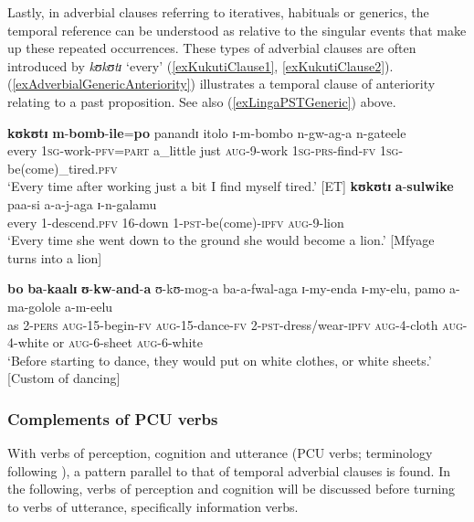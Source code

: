 Lastly, in adverbial clauses referring to iteratives, habituals or generics, the temporal reference can be understood as relative to the singular events that make up these repeated occurrences. These types of adverbial clauses are often introduced by \textit{kʊkʊtɪ} \lq every' (\ref{exKukutiClause1}, \ref{exKukutiClause2}). (\ref{exAdverbialGenericAnteriority}) illustrates a temporal clause of anteriority relating to a past  proposition. See also (\ref{exLingaPSTGeneric}) above.
\begin{exe}
\ex \label{exKukutiClause1}\gll \textbf{kʊkʊtɪ} \textbf{m}-\textbf{bomb}-\textbf{ile}=\textbf{po} panandɪ itolo ɪ-m-bombo n-gw-ag-a n-gateele\\
every \textsc{1sg}-work-\textsc{pfv}=\textsc{part} a\_little just \textsc{aug}-9-work \textsc{1sg}-\textsc{prs}-find-\textsc{fv} \textsc{1sg}-be(come)\_tired.\textsc{pfv}\\
\glt \lq Every time after working just a bit I find myself tired.' [ET]
\ex \label{exKukutiClause2} \gll \textbf{kʊkʊtɪ} \textbf{a}-\textbf{sulwike} paa-si a-a-j-aga ɪ-n-galamu\\
every 1-descend.\textsc{pfv} 16-down 1-\textsc{pst}-be(come)-\textsc{ipfv} \textsc{aug}-9-lion\\
\glt \lq Every time she went down to the ground she would become a lion.' [Mfyage turns into a lion]

\ex\label{exAdverbialGenericAnteriority}\gll \textbf{bo} \textbf{ba}-\textbf{kaalɪ} \textbf{ʊ}-\textbf{kw}-\textbf{and}-\textbf{a} ʊ-kʊ-mog-a ba-a-fwal-aga ɪ-my-enda ɪ-my-elu, pamo a-ma-golole a-m-eelu
\\
as 2-\textsc{pers} \textsc{aug}-15-begin-\textsc{fv} \textsc{aug}-15-dance-\textsc{fv} 2-\textsc{pst}-dress/wear-\textsc{ipfv} \textsc{aug}-4-cloth \textsc{aug}-4-white or \textsc{aug}-6-sheet \textsc{aug}-6-white\\
\glt \lq Before starting to dance, they would put on white clothes, or white sheets.' [Custom of dancing]
\end{exe}
\subsubsection{Complements of PCU verbs}\label{PRSnonpstPCU}
With verbs of perception, cognition and utterance (PCU verbs; terminology following \citealt{GivonT2001}), a pattern parallel to that of temporal adverbial clauses is found. In the following, verbs of perception and cognition will be discussed before turning to verbs of utterance, specifically information verbs.

